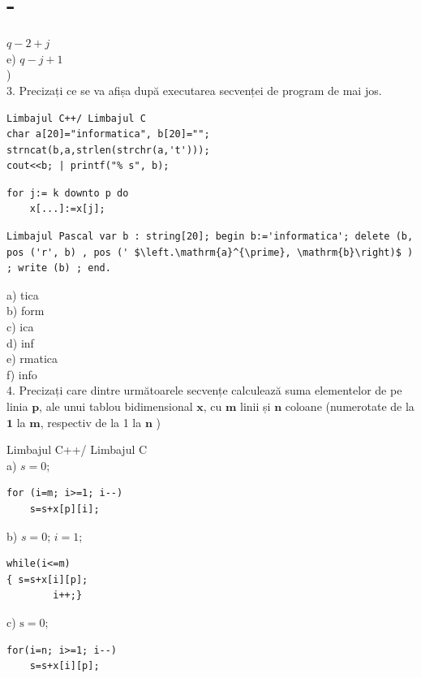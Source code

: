 \documentclass[10pt]{article}
\begin{document}
\section*{-}
$q-2+j$\\
e) $q-j+1$\\
)\\
3. Precizați ce se va afișa după executarea secvenței de program de mai jos.

\begin{verbatim}
Limbajul C++/ Limbajul C
char a[20]="informatica", b[20]="";
strncat(b,a,strlen(strchr(a,'t')));
cout<<b; | printf("% s", b);
\end{verbatim}

\begin{verbatim}
for j:= k downto p do
    x[...]:=x[j];
\end{verbatim}

\begin{verbatim}
Limbajul Pascal var b : string[20]; begin b:='informatica'; delete (b, pos ('r', b) , pos (' $\left.\mathrm{a}^{\prime}, \mathrm{b}\right)$ ) ; write (b) ; end.
\end{verbatim}

a) tica\\
b) form\\
c) ica\\
d) inf\\
e) rmatica\\
f) info\\
4. Precizați care dintre următoarele secvențe calculează suma elementelor de pe linia $\mathbf{p}$, ale unui tablou bidimensional $\mathbf{x}$, cu $\mathbf{m}$ linii și $\mathbf{n}$ coloane (numerotate de la $\mathbf{1}$ la $\mathbf{m}$, respectiv de la 1 la $\mathbf{n}$ )

Limbajul C++/ Limbajul C\\
a) $s=0$;

\begin{verbatim}
for (i=m; i>=1; i--)
    s=s+x[p][i];
\end{verbatim}

b) $s=0$; $i=1$;

\begin{verbatim}
while(i<=m)
{ s=s+x[i][p];
        i++;}
\end{verbatim}

c) $\mathrm{s}=0$;

\begin{verbatim}
for(i=n; i>=1; i--)
    s=s+x[i][p];
\end{verbatim}
\end{document}

